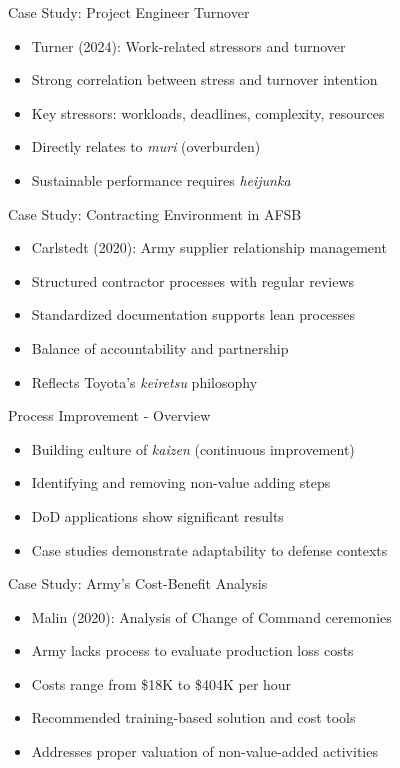 \documentclass[aspectratio=169,11pt,xcolor={dvipsnames},hyperref={pdftex,pdfpagemode=UseNone,hidelinks,pdfdisplaydoctitle=true},usepdftitle=false]{beamer}
\begin{document}
    \begin{frame}{Case Study: Project Engineer Turnover}
      \begin{itemize}
        \item Turner (2024): Work-related stressors and turnover
        \item Strong correlation between stress and turnover intention
        \item Key stressors: workloads, deadlines, complexity, resources
        \item Directly relates to \textit{muri} (overburden)
        \item Sustainable performance requires \textit{heijunka}
      \end{itemize}
    \end{frame}

    \begin{frame}{Case Study: Contracting Environment in AFSB}
      \begin{itemize}
        \item Carlstedt (2020): Army supplier relationship management
        \item Structured contractor processes with regular reviews
        \item Standardized documentation supports lean processes
        \item Balance of accountability and partnership
        \item Reflects Toyota's \textit{keiretsu} philosophy
      \end{itemize}
    \end{frame}

    \begin{frame}{Process Improvement - Overview}
      \begin{itemize}
        \item Building culture of \textit{kaizen} (continuous improvement)
        \item Identifying and removing non-value adding steps
        \item DoD applications show significant results
        \item Case studies demonstrate adaptability to defense contexts
      \end{itemize}
    \end{frame}

    \begin{frame}{Case Study: Army's Cost-Benefit Analysis}
      \begin{itemize}
        \item Malin (2020): Analysis of Change of Command ceremonies
        \item Army lacks process to evaluate production loss costs
        \item Costs range from \$18K to \$404K per hour
        \item Recommended training-based solution and cost tools
        \item Addresses proper valuation of non-value-added activities
      \end{itemize}
    \end{frame}
\end{document}
